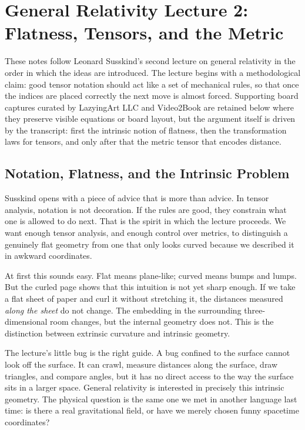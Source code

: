 \chapter{General Relativity Lecture 2: Flatness, Tensors, and the Metric}

These notes follow Leonard Susskind's second lecture on general relativity in the order in which the ideas are introduced. The lecture begins with a methodological claim: good tensor notation should act like a set of mechanical rules, so that once the indices are placed correctly the next move is almost forced. Supporting board captures curated by LazyingArt LLC and Video2Book are retained below where they preserve visible equations or board layout, but the argument itself is driven by the transcript: first the intrinsic notion of flatness, then the transformation laws for tensors, and only after that the metric tensor that encodes distance.

\section{Notation, Flatness, and the Intrinsic Problem}

Susskind opens with a piece of advice that is more than advice. In tensor analysis, notation is not decoration. If the rules are good, they constrain what one is allowed to do next. That is the spirit in which the lecture proceeds. We want enough tensor analysis, and enough control over metrics, to distinguish a genuinely flat geometry from one that only looks curved because we described it in awkward coordinates.

At first this sounds easy. Flat means plane-like; curved means bumps and lumps. But the curled page shows that this intuition is not yet sharp enough. If we take a flat sheet of paper and curl it without stretching it, the distances measured \emph{along the sheet} do not change. The embedding in the surrounding three-dimensional room changes, but the internal geometry does not. This is the distinction between extrinsic curvature and intrinsic geometry.

The lecture's little bug is the right guide. A bug confined to the surface cannot look off the surface. It can crawl, measure distances along the surface, draw triangles, and compare angles, but it has no direct access to the way the surface sits in a larger space. General relativity is interested in precisely this intrinsic geometry. The physical question is the same one we met in another language last time: is there a real gravitational field, or have we merely chosen funny spacetime coordinates?

